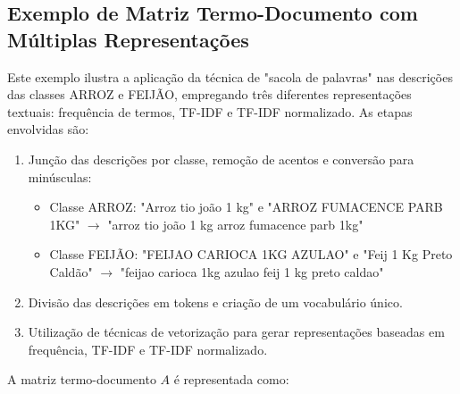 \subsection{Exemplo de Matriz Termo-Documento com Múltiplas Representações}
\label{sec:exemplo-matriz-termo-documento-multiplas-representacoes}
Este exemplo ilustra a aplicação da técnica de "sacola de palavras" nas descrições das classes ARROZ e FEIJÃO, empregando três diferentes representações textuais: frequência de termos, TF-IDF e TF-IDF normalizado. As etapas envolvidas são:

\begin{enumerate}
    \item Junção das descrições por classe, remoção de acentos e conversão para minúsculas:
    \begin{itemize}
        \item Classe ARROZ: "Arroz tio joão 1 kg" e "ARROZ FUMACENCE PARB 1KG" $\rightarrow$ "arroz tio joão 1 kg arroz fumacence parb 1kg"
        \item Classe FEIJÃO: "FEIJAO CARIOCA 1KG AZULAO" e "Feij 1 Kg Preto Caldão" $\rightarrow$ "feijao carioca 1kg azulao feij 1 kg preto caldao"
    \end{itemize}
    \item Divisão das descrições em tokens e criação de um vocabulário único.
    \item Utilização de técnicas de vetorização para gerar representações baseadas em frequência, TF-IDF e TF-IDF normalizado.
\end{enumerate}

A matriz termo-documento \( A \) é representada como:

